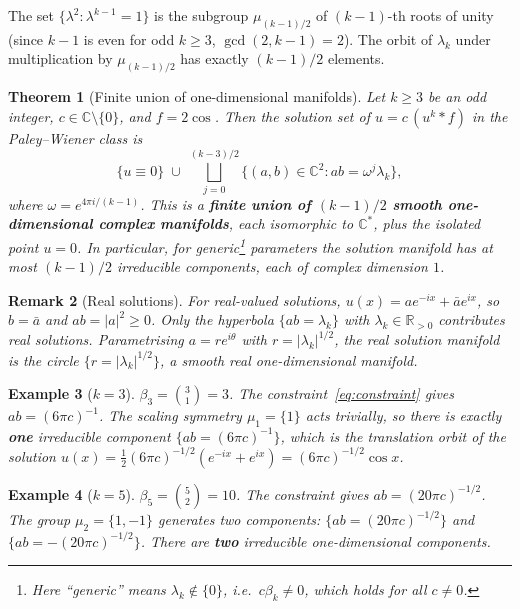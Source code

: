 \documentclass[12pt]{article}
\newtheorem{theorem}{Theorem}[section]
\newtheorem{remark}[theorem]{Remark}
\newtheorem{example}[theorem]{Example}
\newcommand{\R}{\mathbb{R}}
\newcommand{\C}{\mathbb{C}}
\newcommand{\abs}[1]{\left|#1\right|}
\begin{document}
The set $\{\lambda^2 : \lambda^{k-1}=1\}$ is the subgroup $\mu_{(k-1)/2}$
of $(k-1)$-th roots of unity (since $k-1$ is even for odd $k\geq 3$,
$\gcd(2,k-1) = 2$).
The orbit of $\lambda_k$ under multiplication by $\mu_{(k-1)/2}$ has
exactly $(k-1)/2$ elements.

\begin{theorem}[Finite union of one-dimensional manifolds]
  \label{thm:main-1d}
  Let $k \geq 3$ be an odd integer, $c \in \C\setminus\{0\}$, and
  $f = 2\cos$. Then the solution set of $u = c\,(u^k\ast f)$ in the
  Paley--Wiener class is
  \[
    \{u \equiv 0\}
    \;\cup\;
    \bigsqcup_{j=0}^{(k-3)/2}
      \bigl\{(a,b)\in\C^2 : ab = \omega^j\lambda_k\bigr\},
  \]
  where $\omega = e^{4\pi i/(k-1)}$.
  This is a \textbf{finite union of $(k-1)/2$ smooth one-dimensional complex
  manifolds}, each isomorphic to $\C^*$, plus the isolated point $u=0$.
  In particular, for generic\footnote{Here ``generic'' means
  $\lambda_k\notin\{0\}$, i.e.\ $c\beta_k \neq 0$, which holds for
  all $c \neq 0$.}
  parameters the solution manifold has at most $(k-1)/2$ irreducible
  components, each of complex dimension $1$.
\end{theorem}

\begin{remark}[Real solutions]
  For real-valued solutions, $u(x) = a e^{-ix} + \bar a e^{ix}$, so
  $b = \bar a$ and $ab = \abs{a}^2 \geq 0$.
  Only the hyperbola $\{ab = \lambda_k\}$ with $\lambda_k \in \R_{>0}$
  contributes real solutions.
  Parametrising $a = re^{i\theta}$ with $r = \abs{\lambda_k}^{1/2}$, the real
  solution manifold is the circle $\{r = \abs{\lambda_k}^{1/2}\}$,
  a smooth \emph{real} one-dimensional manifold.
\end{remark}

\begin{example}[$k = 3$]
  $\beta_3 = \binom{3}{1} = 3$.
  The constraint~\eqref{eq:constraint} gives $ab = (6\pi c)^{-1}$.
  The scaling symmetry $\mu_1 = \{1\}$ acts trivially, so there is exactly
  \textbf{one} irreducible component $\{ab = (6\pi c)^{-1}\}$, which is the
  translation orbit of the solution
  $u(x) = \tfrac{1}{2}(6\pi c)^{-1/2}(e^{-ix} + e^{ix}) = (6\pi c)^{-1/2}\cos x$.
\end{example}

\begin{example}[$k = 5$]
  $\beta_5 = \binom{5}{2} = 10$.
  The constraint gives $ab = (20\pi c)^{-1/2}$.
  The group $\mu_2 = \{1,-1\}$ generates two components:
  $\{ab = (20\pi c)^{-1/2}\}$ and $\{ab = -(20\pi c)^{-1/2}\}$.
  There are \textbf{two} irreducible one-dimensional components.
\end{example}
\end{document}
